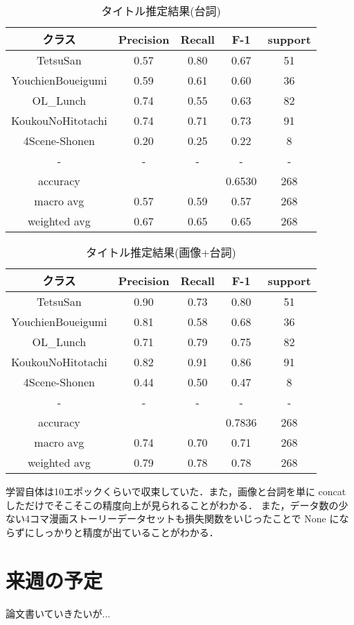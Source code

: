 \documentclass[onecolumn]{ujarticle}   %
\begin{document}
	\begin{table}[h]
		\vspace{-3mm}
		\centering
		\caption{タイトル推定結果(台詞)}
		\label{tab:result_seriftitle}
		\begin{tabular}{|c|c|c|c|c|} \hline
			クラス&Precision&Recall&F-1&support\\ \hline\hline
			TetsuSan&0.57&0.80&0.67&51\\ \hline
			YouchienBoueigumi&0.59&0.61&0.60&36\\ \hline
			OL\_Lunch&0.74&0.55&0.63&82\\ \hline
			KoukouNoHitotachi&0.74&0.71&0.73&91\\ \hline
			4Scene-Shonen&0.20&0.25&0.22&8\\ \hline
			-&-&-&-&-\\ \hline
			accuracy&&&0.6530&268\\ \hline
			macro avg&0.57&0.59&0.57&268\\ \hline
			weighted avg&0.67&0.65&0.65&268\\ \hline
		\end{tabular}
	\end{table}

	\begin{table}[h]
		\vspace{-3mm}
		\centering
		\caption{タイトル推定結果(画像+台詞)}
		\label{tab:result_concattitle}
		\begin{tabular}{|c|c|c|c|c|} \hline
			クラス&Precision&Recall&F-1&support\\ \hline\hline
			TetsuSan&0.90&0.73&0.80&51\\ \hline
			YouchienBoueigumi&0.81&0.58&0.68&36\\ \hline
			OL\_Lunch&0.71&0.79&0.75&82\\ \hline
			KoukouNoHitotachi&0.82&0.91&0.86&91\\ \hline
			4Scene-Shonen&0.44&0.50&0.47&8\\ \hline
			-&-&-&-&-\\ \hline
			accuracy&&&0.7836&268\\ \hline
			macro avg&0.74&0.70&0.71&268\\ \hline
			weighted avg&0.79&0.78&0.78&268\\ \hline
		\end{tabular}
	\end{table}

	学習自体は10エポックくらいで収束していた．また，画像と台詞を単に concat しただけでそこそこの精度向上が見られることがわかる．
	また，データ数の少ない4コマ漫画ストーリーデータセットも損失関数をいじったことで None にならずにしっかりと精度が出ていることがわかる．

	\section{来週の予定}\noindent
	論文書いていきたいが...
\end{document}
